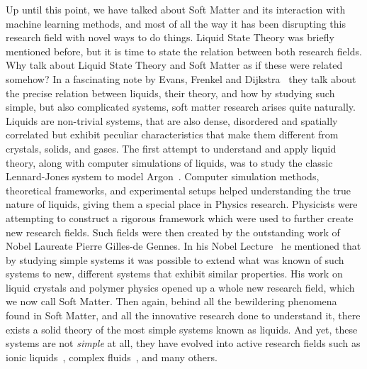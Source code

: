 Up until this point, we have talked about Soft Matter and its interaction with machine
learning methods, and most of all the way it has been disrupting this research field
with novel ways to do things. Liquid State Theory was briefly mentioned before,
but it is time to state the relation between both research fields.
Why talk about Liquid State Theory and Soft Matter as if these were related somehow?
In a fascinating note by Evans, Frenkel and Dijkstra~\cite{evansSimpleLiquidsColloids2019}
they talk about the precise relation between liquids, their theory, and how by studying
such simple, but also complicated systems, soft matter research arises quite naturally.
Liquids are non-trivial systems, that are also dense, disordered and spatially correlated
but exhibit peculiar characteristics that make them different from crystals, solids,
and gases. The first attempt to understand and apply liquid theory,
along with computer simulations of liquids, was to study the
classic Lennard-Jones system to model Argon~\cite{mcdonaldCalculationThermodynamicProperties1967,verletComputerExperimentsClassical1967a}. 
Computer simulation methods, theoretical frameworks, and experimental setups helped 
understanding the true nature of liquids, giving them a special place in Physics research. 
Physicists were attempting to construct a rigorous framework which were used to 
further create new research fields.
Such fields were then created by the outstanding work of Nobel Laureate Pierre Gilles-de 
Gennes. In his Nobel Lecture~\cite{degennesSoftMatter1992} he mentioned that by studying 
simple systems it was possible to extend what was known of such systems to new, different 
systems that exhibit similar properties. His work on liquid crystals and polymer physics 
opened up a whole new research field, which we now call Soft Matter.
Then again, behind all the bewildering phenomena found in Soft Matter, and all the 
innovative research done to understand it, there exists a solid theory of the most simple 
systems known as liquids. And yet, these systems are not \emph{simple} at all, they
have evolved into active research fields such as ionic liquids~\cite{rogersIonicLiquidsSolvents2003}, complex fluids~\cite{gelbartNewScienceComplex1996},
and many others.

